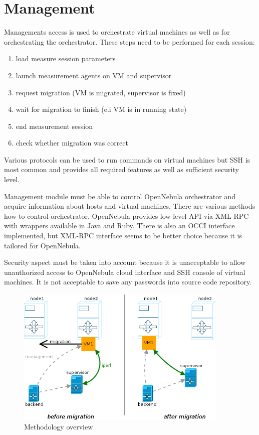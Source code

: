 \section{Management}
Managements access is used to orchestrate virtual machines as well as for orchestrating the orchestrator. These steps need to be performed for each session: 
\begin{enumerate}
	\item load measure session parameters
	\item launch measurement agents on \Ac{VM} and supervisor
	\item request migration (\Ac{VM} is migrated, supervisor is fixed)
	\item wait for migration to finish (e.i \Ac{VM} is in running state)
	\item end measurement session
	\item check whether migration was correct
\end{enumerate}

Various protocols can be used to run commands on virtual machines but \Ac{SSH} is most common and provides all required features as well as sufficient security level. 

Management module must be able to control OpenNebula orchestrator and acquire information about hosts and virtual machines. There are various methods how to control orchestrator. OpenNebula provides low-level \Ac{API} via \Ac{XML}-\Ac{RPC} with wrappers available in Java and Ruby. There is also an \Ac{OCCI} interface implemented, but \Ac{XML}-\Ac{RPC} interface seems to be better choice because it is tailored for OpenNebula.

Security aspect must be taken into account because it is unacceptable to allow unauthorized access to OpenNebula cloud interface and \Ac{SSH} console of virtual machines. It is not acceptable to save any passwords into source code repository. 

\begin{figure}[htb]
	\begin{center}
	\includegraphics[width=0.9\textwidth]{methodology.png}
	\end{center}
	\caption{Methodology overview}
	\label{img:methodology}
\end{figure}

